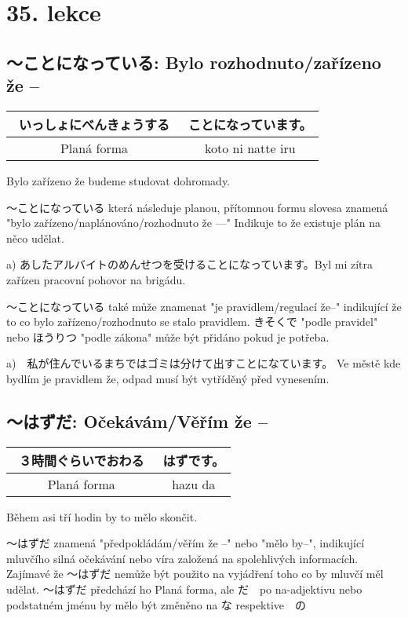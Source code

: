 


\section{35. lekce}
\label{sec:lekce_35}

\subsection{〜ことになっている: Bylo rozhodnuto/zařízeno že --}
\begin{center}
\begin{tabular}{||c|c||}
\hline
いっしょにべんきょうする　&ことになっています。\\
\hline
Planá forma&koto ni natte iru\\
\hline
\end{tabular}
\end{center}
Bylo zařízeno že budeme studovat dohromady.

〜ことになっている která následuje planou, přítomnou formu slovesa znamená "bylo zařízeno/naplánováno/rozhodnuto že ---" Indikuje to že existuje plán na něco udělat.

a) あしたアルバイトのめんせつを受けることになっています。Byl mi zítra zařízen pracovní pohovor na brigádu.

〜ことになっている také může znamenat "je pravidlem/regulací že--" indikující že to co bylo zařízeno/rozhodnuto se stalo pravidlem. きそくで "podle pravidel" nebo ほうりつ "podle zákona" může být přidáno pokud je potřeba.

a)　私が住んでいるまちではゴミは分けて出すことになています。 Ve městě kde bydlím je pravidlem že, odpad musí být vytříděný před vynesením.




\subsection{〜はずだ: Očekávám/Věřím že --}

\begin{center}
\begin{tabular}{||c|c||}
\hline
３時間ぐらいでおわる　&はずです。\\
\hline
Planá forma&hazu da\\
\hline
\end{tabular}
\end{center}
Během asi tří hodin by to mělo skončit.

〜はずだ znamená "předpokládám/věřím že --" nebo "mělo by--", indikující mluvčího silná očekávání nebo víra založená na spolehlivých informacích. Zajímavé že 〜はずだ nemůže být použito na vyjádření toho co by mluvčí měl udělat. 〜はずだ předchází ho Planá forma, ale だ　po na-adjektivu nebo podstatném jménu by mělo být změněno na な respektive　の

